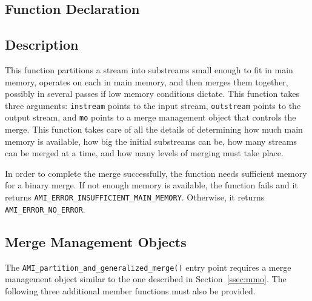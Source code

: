 \subsection{Function Declaration}
  \btabb
     {}
  \etabb

\subsection{Description}
This function partitions a stream into substreams small
enough to fit in main memory, operates on each in main memory, and then
merges them together, possibly in several passes if low memory conditions
dictate. This function takes three arguments:
\lstinline|instream| points to the input stream,
\lstinline|outstream| points to the output stream, and
\lstinline|mo| points to a merge management object that controls the merge.
This function takes care of all the details of determining how much main
memory is available, how big the initial substreams can be, how many
streams can be merged at a time, and how many levels of merging must take
place.

In order to complete the merge successfully, the function needs sufficient
memory for a binary merge. If not enough memory is available, the function
fails and it returns
\lstinline|AMI_ERROR_INSUFFICIENT_MAIN_MEMORY|. Otherwise, it returns
\lstinline|AMI_ERROR_NO_ERROR|.

\subsection{Merge Management Objects}
The \lstinline|AMI_partition_and_generalized_merge()| entry point requires
a merge management object similar to the one described in
Section~\ref{ssec:mmo}. The following three additional member functions
must also be provided.

